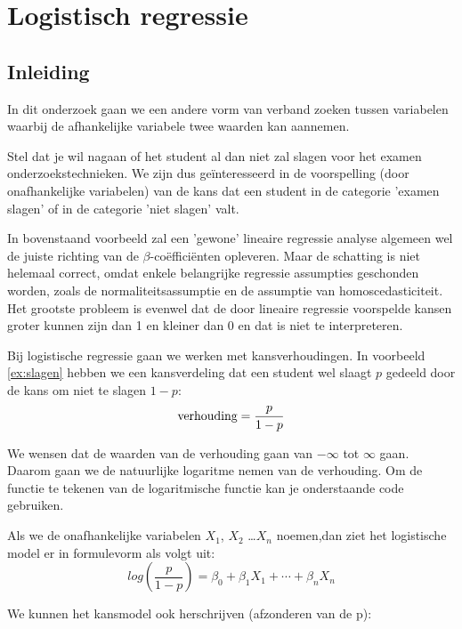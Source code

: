 \chapter{Logistisch regressie}

\section{Inleiding}

In dit onderzoek gaan we een andere vorm van verband zoeken tussen variabelen waarbij de afhankelijke variabele twee waarden kan aannemen. 

\begin{example}
	\label{ex:slagen}
	Stel dat je wil nagaan of het student al dan niet zal slagen voor het examen onderzoekstechnieken. We zijn dus ge\"interesseerd in de voorspelling (door
	onafhankelijke variabelen) van de kans dat een student in de categorie 'examen slagen' of in de categorie 'niet slagen' valt. 
\end{example}

In bovenstaand voorbeeld zal een 'gewone' lineaire regressie analyse 
algemeen wel de juiste richting van de $\beta$-co\"efficiënten opleveren. Maar de schatting is niet helemaal correct, omdat enkele belangrijke regressie assumpties geschonden worden, zoals de normaliteitsassumptie en de assumptie van homoscedasticiteit. Het grootste probleem is evenwel dat de door lineaire regressie voorspelde kansen groter kunnen zijn dan 1 en kleiner dan 0 en dat is niet te interpreteren.

Bij logistische regressie gaan we werken met kansverhoudingen. In voorbeeld \ref{ex:slagen} hebben we een kansverdeling dat een student wel slaagt $p$ gedeeld door de kans om niet te slagen $1-p$:
\[ 
	\textnormal{verhouding} = \frac{p}{1-p}
\]

We wensen dat de waarden van de verhouding gaan van $- \infty$ tot $\infty$ gaan. Daarom gaan we de natuurlijke logaritme nemen van de verhouding. Om de functie te tekenen van de logaritmische functie kan je onderstaande code gebruiken. 



Als we de onafhankelijke variabelen $X_1$, $X_2$  \dots $X_n$ noemen,dan ziet het logistische model er in formulevorm als volgt uit:
\[ 
	log(\frac{p}{1-p}) = \beta_0 + \beta_1 X_1 + \cdots + \beta_n X_n 
\]

We kunnen het kansmodel ook herschrijven (afzonderen van de p):

